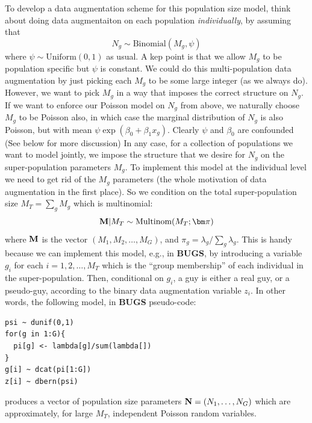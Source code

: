 To develop a data augmentation scheme for this population size model, 
think about doing data augmentaiton on each
population {\it individually}, by assuming that 
\[
 N_{g} \sim \mbox{Binomial}(M_{g} , \psi)
\]
where $\psi \sim \mbox{Uniform}(0,1)$ as usual.  A kep point is that
we allow $M_{g}$ to be population specific but $\psi$ is constant.  We
could do this multi-population data augmentation by just picking each
$M_{g}$ to be some large integer (as we always do). However, we want
to pick $M_{g}$ in a way that imposes the correct structure on
$N_{g}$. If we want to enforce our Poisson model on $N_{g}$ from
above, we naturally choose $M_{g}$ to be Poisson also, in which case
the marginal distribution of $N_{g}$ is also Poisson, but with mean
$\psi \exp(\beta_{0} + \beta_{1}x_{g})$.  Clearly $\psi$ and
$\beta_{0}$ are confounded (See below for more discussion)
In any case, for a collection of populations we want to model jointly,
we impose the structure that we desire for $N_{g}$ on the
super-population parameters $M_{g}$.
To implement this model at the individual level we need to get rid
of the $M_{g}$ parameters (the whole motivation of data augmentation in
the first place). So we condition on the total super-population size
$M_{T}= \sum_{g} M_{g}$ which is multinomial:
\begin{equation}
{\bf M}|M_{T} \sim \mbox{Multinom}(M_{T};  {\bm \pi} ) 
\label{eq.mn1}
\end{equation}
where ${\bf M}$ is the vector $(M_{1}, M_{2},\ldots,M_{G})$, and
 $\pi_{g} = \lambda_{g}/\sum_{g} \lambda_{g}$.
This is handy because we can implement this
model, e.g., in {\bf BUGS}, by introducing a variable $g_{i}$ for each $i=1,2,\ldots, M_{T}$
which is the ``group membership'' of each individual in the
super-population.   Then, conditional on $g_{i}$, a guy is either a
real guy, or a pseudo-guy, according to the binary data augmentation
variable $z_{i}$.  In other words, the following model, in {\bf BUGS} pseudo-code:
\begin{verbatim}
psi ~ dunif(0,1)
for(g in 1:G){
  pi[g] <- lambda[g]/sum(lambda[])
}
g[i] ~ dcat(pi[1:G])
z[i] ~ dbern(psi)
\end{verbatim}
produces a vector of population size parameters ${\bf N} = (N_{1},\ldots,N_{G})$
which are approximately, for large $M_{T}$, independent Poisson random variables. 


